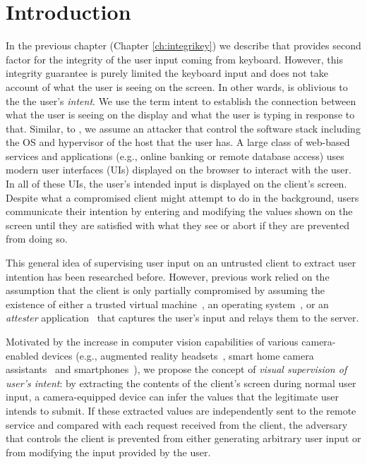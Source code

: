 \section{Introduction}
\label{integriscreen:sec:intro}

In the previous chapter (Chapter \ref{ch:integrikey}) we describe \integrikey that provides second factor for the integrity of the user input coming from keyboard. However, this integrity guarantee is purely limited the keyboard input and does not take account of what the user is seeing on the screen. In other wards, \integrikey is oblivious to the the user's \emph{intent}. We use the term intent to establish the connection between what the user is seeing on the display and what the user is typing in response to that. Similar, to \integrikey, we assume an attacker that control the software stack including the OS and hypervisor of the host that the user has. A large class of web-based services and applications (e.g., online banking or remote database access) uses modern user interfaces (UIs) displayed on the browser to interact with the user. In all of these UIs, the user's intended input is displayed on the client's screen. Despite what a compromised client might attempt to do in the background, users communicate their intention by entering and modifying the values shown on the screen until they are satisfied with what they see or abort if they are prevented from doing so.

This general idea of supervising user input on an untrusted client to extract user intention has been researched before. However, previous work relied on the assumption that the client is only partially compromised by assuming the existence of either a trusted virtual machine~\cite{gyrus}, an operating system~\cite{binder}, or an \emph{attester} application~\cite{nab} that captures the user's input and relays them to the server. 

Motivated by the increase in computer vision capabilities of various camera-enabled devices (e.g., augmented reality headsets~\cite{TimCookAR, HoloLens2}, smart home camera assistants~\cite{fleck2008smart, lenovoSmartHome} and smartphones~\cite{wald2018real, smartphonesCV}), we propose the concept of \emph{visual supervision of user's intent}: by extracting the contents of the client's screen during normal user input, a camera-equipped device can infer the values that the legitimate user intends to submit. If these extracted values are independently sent to the remote service and compared with each request received from the client, the adversary that controls the client is prevented from either generating arbitrary user input or from modifying the input provided by the user.


